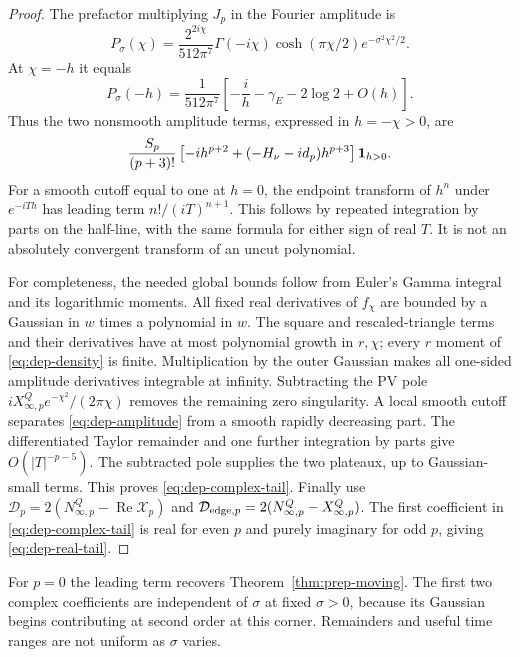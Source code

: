 \begin{proof}
The prefactor multiplying $J_p$ in the Fourier amplitude is
\begin{equation}
 P_\sigma(\chi)=\frac{2^{2i\chi}}{512\pi^7}
   \Gamma(-i\chi)\cosh(\pi\chi/2)e^{-\sigma^2\chi^2/2}.
 \label{eq:dep-prefactor}
\end{equation}
At $\chi=-h$ it equals
\[
 P_\sigma(-h)=\frac1{512\pi^7}
       \left[-\frac ih-\gamma_E-2\log2+O(h)\right].
\]
Thus the two nonsmooth amplitude terms, expressed in $h=-\chi>0$,
are
\begin{equation}
 \frac{S_p}{(p+3)!}\left[-ih^{p+2}
                   +(-H_\nu-id_p)h^{p+3}\right]\mathbf 1_{h>0}.
 \label{eq:dep-amplitude}
\end{equation}
For a smooth cutoff equal to one at $h=0$, the endpoint transform of
$h^n$ under $e^{-iTh}$ has leading term $n!/(iT)^{n+1}$.
This follows by repeated integration by parts on the half-line, with
the same formula for either sign of real $T$. It is not an absolutely
convergent transform of an uncut polynomial.

For completeness, the needed global bounds follow from Euler's Gamma
integral and its logarithmic moments. All fixed real derivatives of
$f_\chi$ are bounded by a Gaussian in $w$ times a polynomial in $w$.
The square and rescaled-triangle terms and their derivatives have at
most polynomial growth in $r,\chi$; every $r$ moment of \eqref{eq:dep-density}
is finite. Multiplication by the outer Gaussian makes all one-sided
amplitude derivatives integrable at infinity. Subtracting the PV pole
$iX_{\infty,p}^Q e^{-\chi^2}/(2\pi\chi)$ removes the remaining zero
singularity. A local smooth cutoff separates
\eqref{eq:dep-amplitude} from a smooth rapidly decreasing part. The
differentiated Taylor remainder and one further integration by parts
give $O(|T|^{-p-5})$. The subtracted pole supplies the two plateaux,
up to Gaussian-small terms. This proves \eqref{eq:dep-complex-tail}.
Finally use
$\mathcal D_p=2(N_{\infty,p}^Q-\operatorname{Re}\mathcal X_p)$ and
$\mathcal D_{{\rm edge},p}=2(N_{\infty,p}^Q-X_{\infty,p}^Q)$.
The first coefficient in \eqref{eq:dep-complex-tail} is real for even
$p$ and purely imaginary for odd $p$, giving \eqref{eq:dep-real-tail}.
\end{proof}
For $p=0$ the leading term recovers Theorem~\ref{thm:prep-moving}.
The first two complex coefficients are independent of $\sigma$ at
fixed $\sigma>0$, because its Gaussian begins contributing at second
order at this corner. Remainders and useful time ranges are not uniform
as $\sigma$ varies.


